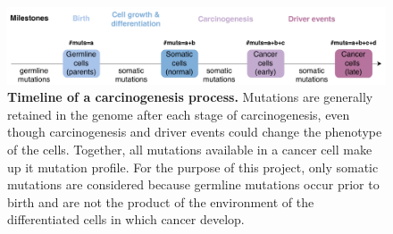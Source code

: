 \begin{figure}[h!]
    \centering
    \includegraphics[scale=0.78]{graphics/drivers_demo.pdf}
    \caption{\textbf{Timeline of a carcinogenesis process.} Mutations are generally retained in the genome after each stage of carcinogenesis, even though carcinogenesis and driver events could change the phenotype of the cells. Together, all mutations available in a cancer cell make up it mutation profile. For the purpose of this project, only somatic mutations are considered because germline mutations occur prior to birth and are not the product of the environment of the differentiated cells in which cancer develop.}
    \label{fig:drivers_demo}
\end{figure}
